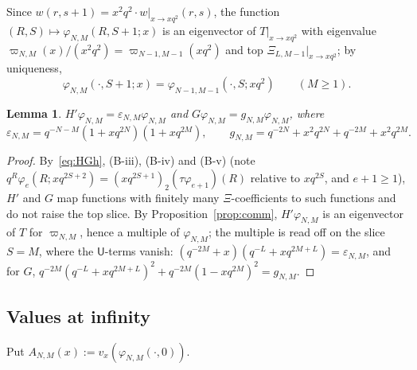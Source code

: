 \documentclass[11pt]{amsart}
\newtheorem{lemma}[theorem]{Lemma}
\theoremstyle{definition}
\numberwithin{equation}{section}
\begin{document}
Since $w(r,s+1)=x^2q^2\cdot w|_{x\to xq^2}(r,s)$, the function $(R,S)\mapsto\varphi_{N,M}(R,S+1;x)$ is an eigenvector of
$T|_{x\to xq^2}$ with eigenvalue $\varpi_{N,M}(x)/(x^2q^2)=\varpi_{N-1,M-1}(xq^2)$ and top $\Xi_{L,M-1}|_{x\to xq^2}$; by
uniqueness,
\begin{equation}\label{eq:shift}
\varphi_{N,M}(\cdot,S+1;x)=\varphi_{N-1,M-1}(\cdot,S;xq^2)\qquad(M\ge1).
\end{equation}

\begin{lemma}\label{lem:HGeig}
$H'\varphi_{N,M}=\varepsilon_{N,M}\varphi_{N,M}$ and $G\varphi_{N,M}=g_{N,M}\varphi_{N,M}$, where
\[\varepsilon_{N,M}=q^{-N-M}(1+xq^{2N})(1+xq^{2M}),\qquad g_{N,M}=q^{-2N}+x^2q^{2N}+q^{-2M}+x^2q^{2M}.\]
\end{lemma}
\begin{proof}
By~\eqref{eq:HGh}, (B-iii), (B-iv) and (B-v) (note $q^R\varphi_e(R;xq^{2S+2})=(xq^{2S+1})_2(\tau\varphi_{e+1})(R)$ relative to
$xq^{2S}$, and $e+1\ge1$), $H'$ and $G$ map functions with finitely many $\Xi$-coefficients to such functions and do
not raise the top slice. By Proposition~\ref{prop:comm}, $H'\varphi_{N,M}$ is an eigenvector of $T$ for
$\varpi_{N,M}$, hence a multiple of $\varphi_{N,M}$; the multiple is read off on the slice $S=M$, where the
$\mathsf U$-terms vanish: $(q^{-2M}+x)(q^{-L}+xq^{2M+L})=\varepsilon_{N,M}$, and for $G$,
$q^{-2M}(q^{-L}+xq^{2M+L})^2+q^{-2M}(1-xq^{2M})^2=g_{N,M}$.
\end{proof}

\subsection{Values at infinity}\label{ssec:vinf}
Put $A_{N,M}(x):=v_x(\varphi_{N,M}(\cdot,0))$.
\end{document}
